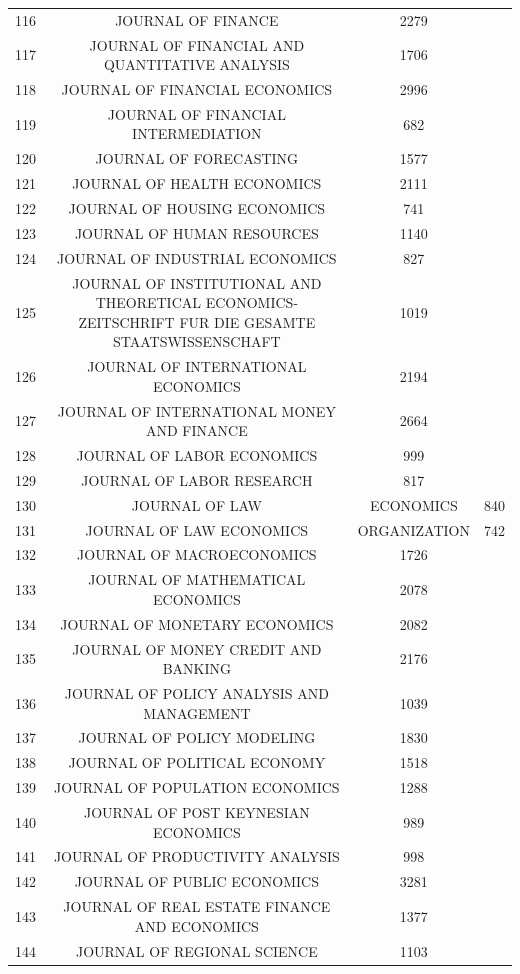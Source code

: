 \begin{tabular}{@{\extracolsep{5pt}} ccc}
116 & JOURNAL OF FINANCE & 2279 \\ 
117 & JOURNAL OF FINANCIAL AND QUANTITATIVE ANALYSIS & 1706 \\ 
118 & JOURNAL OF FINANCIAL ECONOMICS & 2996 \\ 
119 & JOURNAL OF FINANCIAL INTERMEDIATION & 682 \\ 
120 & JOURNAL OF FORECASTING & 1577 \\ 
121 & JOURNAL OF HEALTH ECONOMICS & 2111 \\ 
122 & JOURNAL OF HOUSING ECONOMICS & 741 \\ 
123 & JOURNAL OF HUMAN RESOURCES & 1140 \\ 
124 & JOURNAL OF INDUSTRIAL ECONOMICS & 827 \\ 
125 & JOURNAL OF INSTITUTIONAL AND THEORETICAL ECONOMICS-ZEITSCHRIFT FUR DIE GESAMTE STAATSWISSENSCHAFT & 1019 \\ 
126 & JOURNAL OF INTERNATIONAL ECONOMICS & 2194 \\ 
127 & JOURNAL OF INTERNATIONAL MONEY AND FINANCE & 2664 \\ 
128 & JOURNAL OF LABOR ECONOMICS & 999 \\ 
129 & JOURNAL OF LABOR RESEARCH & 817 \\ 
130 & JOURNAL OF LAW & ECONOMICS & 840 \\ 
131 & JOURNAL OF LAW ECONOMICS & ORGANIZATION & 742 \\ 
132 & JOURNAL OF MACROECONOMICS & 1726 \\ 
133 & JOURNAL OF MATHEMATICAL ECONOMICS & 2078 \\ 
134 & JOURNAL OF MONETARY ECONOMICS & 2082 \\ 
135 & JOURNAL OF MONEY CREDIT AND BANKING & 2176 \\ 
136 & JOURNAL OF POLICY ANALYSIS AND MANAGEMENT & 1039 \\ 
137 & JOURNAL OF POLICY MODELING & 1830 \\ 
138 & JOURNAL OF POLITICAL ECONOMY & 1518 \\ 
139 & JOURNAL OF POPULATION ECONOMICS & 1288 \\ 
140 & JOURNAL OF POST KEYNESIAN ECONOMICS & 989 \\ 
141 & JOURNAL OF PRODUCTIVITY ANALYSIS & 998 \\ 
142 & JOURNAL OF PUBLIC ECONOMICS & 3281 \\ 
143 & JOURNAL OF REAL ESTATE FINANCE AND ECONOMICS & 1377 \\ 
144 & JOURNAL OF REGIONAL SCIENCE & 1103 \\ 

\end{tabular}
